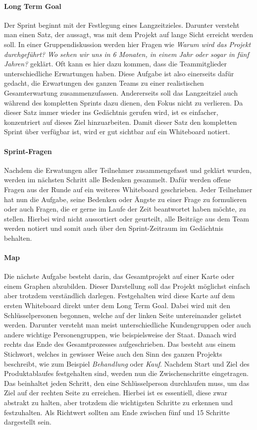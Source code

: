 \paragraph{Long Term Goal}
Der Sprint beginnt mit der Festlegung eines Langzeitzieles. Darunter versteht man einen Satz, der aussagt, was mit dem Projekt auf lange Sicht erreicht werden soll. In einer Gruppendiskussion werden hier Fragen wie \textit{Warum wird das Projekt durchgeführt? Wo sehen wir uns in 6 Monaten, in einem Jahr oder sogar in fünf Jahren?} geklärt. Oft kann es hier dazu kommen, dass die Teammitglieder unterschiedliche Erwartungen haben. Diese Aufgabe ist also einerseits dafür gedacht, die Erwartungen des ganzen Teams zu einer realistischen Gesamterwartung zusammenzufassen. Andererseits soll das Langzeitziel auch während des kompletten Sprints dazu dienen, den Fokus nicht zu verlieren. Da dieser Satz immer wieder ins Gedächtnis gerufen wird, ist es einfacher, konzentriert auf dieses Ziel hinzuarbeiten. Damit dieser Satz den kompletten Sprint über verfügbar ist, wird er gut sichtbar auf ein Whiteboard notiert. 

\paragraph{Sprint-Fragen}
Nachdem die Erwatungen aller Teilnehmer zusammengefasst und geklärt wurden, werden im nächsten Schritt alle Bedenken gesammelt. Dafür werden offene Fragen aus der Runde auf ein weiteres Whiteboard geschrieben. Jeder Teilnehmer hat nun die Aufgabe, seine Bedenken oder Ängste zu einer Frage zu formulieren oder auch Fragen, die er gerne im Laufe der Zeit beantwortet haben möchte, zu stellen. Hierbei wird nicht aussortiert oder geurteilt, alle Beiträge aus dem Team werden notiert und somit auch über den Sprint-Zeitraum im Gedächtnis behalten. 

\paragraph{Map}
Die nächste Aufgabe besteht darin, das Gesamtprojekt auf einer Karte oder einem Graphen abzubilden. Dieser Darstellung soll das Projekt möglichst einfach aber trotzdem verständlich darlegen. Festgehalten wird diese Karte auf dem ersten Whiteboard direkt unter dem Long Term Goal. Dabei wird mit den Schlüsselpersonen begonnen, welche auf der linken Seite untereinander gelistet werden. Darunter versteht man meist unterschiedliche Kundengruppen oder auch andere wichtige Personengruppen, wie beispielsweise der Staat. Danach wird rechts das Ende des Gesamtprozesses aufgeschrieben. Das besteht aus einem Stichwort, welches in gewisser Weise auch den Sinn des ganzen Projekts beschreibt, wie zum Beispiel \textit{Behandlung} oder \textit{Kauf}. Nachdem Start und Ziel des Produktablaufes festgehalten sind, werden nun die Zwischenschritte eingetragen. Das beinhaltet jeden Schritt, den eine Schlüsselperson durchlaufen muss, um das Ziel auf der rechten Seite zu erreichen. Hierbei ist es essentiell, diese zwar abstrakt zu halten, aber trotzdem die wichtigsten Schritte zu erkennen und festzuhalten. Als Richtwert sollten am Ende zwischen fünf und 15 Schritte dargestellt sein.

